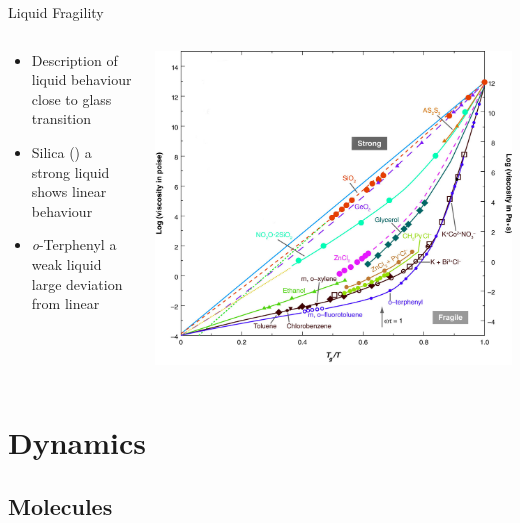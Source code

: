 \documentclass[16pt, aspectratio=43,compress]{beamer}
\begin{document}
\begin{frame}{Liquid Fragility}
    \begin{columns}
        \begin{column}{0.5\linewidth}
            \begin{itemize}
                \item Description of liquid behaviour close to glass transition
                \item Silica () a strong liquid shows linear behaviour
                \item {\em o}-Terphenyl a weak liquid large deviation from linear
            \end{itemize}
        \end{column}
        \begin{column}{0.5\linewidth}
            \includegraphics[width=\textwidth]{angell}
        \end{column}
    \end{columns}
\end{frame}

\section{Dynamics}

\subsection{Molecules}
\end{document}
